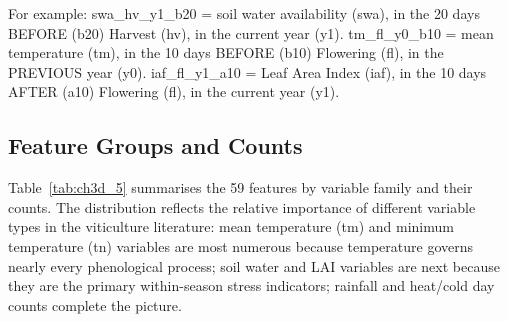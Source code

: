 For example: swa\_hv\_y1\_b20 = soil water availability (swa), in the 20 days BEFORE (b20) Harvest (hv), in the current year (y1). tm\_fl\_y0\_b10 = mean temperature (tm), in the 10 days BEFORE (b10) Flowering (fl), in the PREVIOUS year (y0). iaf\_fl\_y1\_a10 = Leaf Area Index (iaf), in the 10 days AFTER (a10) Flowering (fl), in the current year (y1).


\subsection{Feature Groups and Counts}\label{sub:feature_groups_and_counts}

Table~\ref{tab:ch3d_5} summarises the 59 features by variable family and their counts. The distribution reflects the relative importance of different variable types in the viticulture literature: mean temperature (tm) and minimum temperature (tn) variables are most numerous because temperature governs nearly every phenological process; soil water and LAI variables are next because they are the primary within-season stress indicators; rainfall and heat/cold day counts complete the picture.

